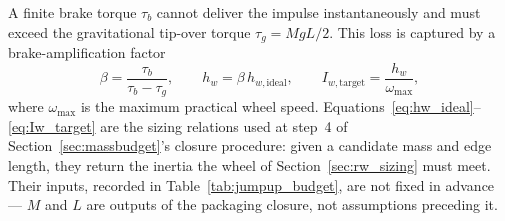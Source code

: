 A finite brake torque $\tau_b$ cannot deliver the impulse instantaneously and
must exceed the gravitational tip-over torque $\tau_g = MgL/2$. This loss is
captured by a brake-amplification factor
\begin{equation}
\beta = \frac{\tau_b}{\tau_b - \tau_g},
\qquad
h_w = \beta\,h_{w,\text{ideal}},
\qquad
I_{w,\text{target}} = \frac{h_w}{\omega_{\max}},
\label{eq:Iw_target}
\end{equation}
where $\omega_{\max}$ is the maximum practical wheel speed.
Equations~\eqref{eq:hw_ideal}--\eqref{eq:Iw_target} are the sizing relations
used at step~4 of Section~\ref{sec:massbudget}'s closure procedure: given a
candidate mass and edge length, they return the inertia the wheel of
Section~\ref{sec:rw_sizing} must meet. Their inputs, recorded in
Table~\ref{tab:jumpup_budget}, are not fixed in advance --- $M$ and $L$ are
outputs of the packaging closure, not assumptions preceding it.

